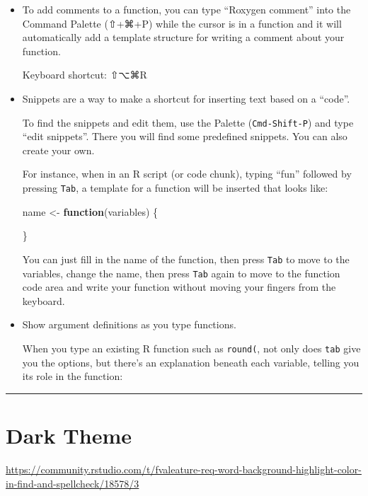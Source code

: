 \documentclass[
  a4paper,
  twoside,
  openright]{book}
\newenvironment{Shaded}{\begin{snugshade}}{\end{snugshade}}
\newcommand{\ControlFlowTok}[1]{\textcolor[rgb]{0.13,0.29,0.53}{\textbf{#1}}}
\newcommand{\NormalTok}[1]{#1}
\newcommand{\OtherTok}[1]{\textcolor[rgb]{0.56,0.35,0.01}{#1}}
\theoremstyle{definition}
\theoremstyle{definition}
\theoremstyle{definition}
\theoremstyle{definition}
\theoremstyle{remark}
\begin{document}
\begin{itemize}
\item
  To add comments to a function, you can type ``Roxygen comment'' into the Command Palette (⇧+⌘+P) while the cursor is in a function and it will automatically add a template structure for writing a comment about your function.

  Keyboard shortcut: ⇧⌥⌘R
\item
  Snippets are a way to make a shortcut for inserting text based on a ``code''.

  To find the snippets and edit them, use the Palette (\texttt{Cmd-Shift-P}) and type ``edit snippets''. There you will find some predefined snippets. You can also create your own.

  For instance, when in an R script (or code chunk), typing ``fun'' followed by pressing \texttt{Tab}, a template for a function will be inserted that looks like:

\begin{Shaded}
\begin{Highlighting}[]
\NormalTok{name }\OtherTok{\textless{}{-}} \ControlFlowTok{function}\NormalTok{(variables) \{}

\NormalTok{\}}
\end{Highlighting}
\end{Shaded}

  You can just fill in the name of the function, then press \texttt{Tab} to move to the variables, change the name, then press \texttt{Tab} again to move to the function code area and write your function without moving your fingers from the keyboard.
\item
  Show argument definitions as you type functions.

  When you type an existing R function such as \texttt{round(}, not only does {\texttt{tab}} give you the options, but there's an explanation beneath each variable, telling you its role in the function:
\end{itemize}

\begin{center}\rule{0.5\linewidth}{0.5pt}\end{center}

\section{Dark Theme}\label{dark-theme}

\url{https://community.rstudio.com/t/fvaleature-req-word-background-highlight-color-in-find-and-spellcheck/18578/3}
\end{document}
